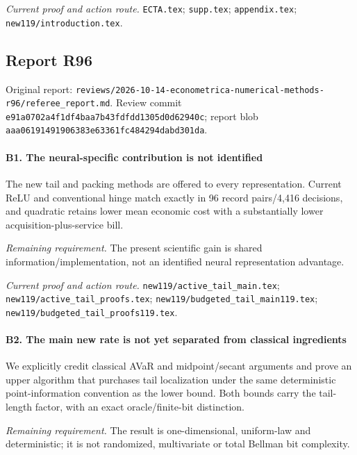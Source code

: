 \par\emph{Current proof and action route.} \nolinkurl{ECTA.tex}; \nolinkurl{supp.tex}; \nolinkurl{appendix.tex}; \nolinkurl{new119/introduction.tex}.

\subsection{Report R96}

Original report: \nolinkurl{reviews/2026-10-14-econometrica-numerical-methods-r96/referee_report.md}. Review commit \nolinkurl{e91a0702a4f1df4baa7b43fdfdd1305d0d62940c}; report blob \nolinkurl{aaa06191491906383e63361fc484294dabd301da}.

\paragraph{B1. The neural-specific contribution is not identified}

The new tail and packing methods are offered to every representation. Current ReLU and conventional hinge match exactly in 96 record pairs/4,416 decisions, and quadratic retains lower mean economic cost with a substantially lower acquisition-plus-service bill.

\par\emph{Remaining requirement.} The present scientific gain is shared information/\allowbreak{}implementation, not an identified neural representation advantage.

\par\emph{Current proof and action route.} \nolinkurl{new119/active_tail_main.tex}; \nolinkurl{new119/active_tail_proofs.tex}; \nolinkurl{new119/budgeted_tail_main119.tex}; \nolinkurl{new119/budgeted_tail_proofs119.tex}.

\paragraph{B2. The main new rate is not yet separated from classical ingredients}

We explicitly credit classical AVaR and midpoint/\allowbreak{}secant arguments and prove an upper algorithm that purchases tail localization under the same deterministic point-information convention as the lower bound. Both bounds carry the tail-length factor, with an exact oracle/\allowbreak{}finite-bit distinction.

\par\emph{Remaining requirement.} The result is one-dimensional, uniform-law and deterministic; it is not randomized, multivariate or total Bellman bit complexity.

